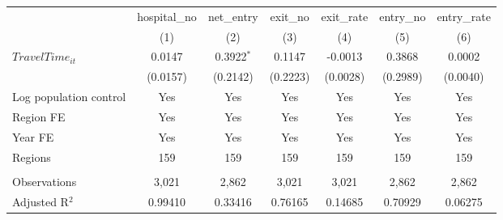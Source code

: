 \begingroup
\centering
\begin{tabular}{lcccccc}
   \toprule
                          & hospital\_no  & net\_entry   & exit\_no  & exit\_rate  & entry\_no  & entry\_rate \\    
                          & (1)           & (2)          & (3)       & (4)         & (5)        & (6)\\  
   \midrule 
   $TravelTime_{it}$      & 0.0147        & 0.3922$^{*}$ & 0.1147    & -0.0013     & 0.3868     & 0.0002\\   
                          & (0.0157)      & (0.2142)     & (0.2223)  & (0.0028)    & (0.2989)   & (0.0040)\\   
   Log population control & Yes           & Yes          & Yes       & Yes         & Yes        & Yes\\  
   Region FE              & Yes           & Yes          & Yes       & Yes         & Yes        & Yes\\  
   Year FE                & Yes           & Yes          & Yes       & Yes         & Yes        & Yes\\  
   Regions                & 159           & 159          & 159       & 159         & 159        & 159\\  
    \\
   Observations           & 3,021         & 2,862        & 3,021     & 3,021       & 2,862      & 2,862\\  
   Adjusted R$^2$         & 0.99410       & 0.33416      & 0.76165   & 0.14685     & 0.70929    & 0.06275\\  
   \bottomrule
\end{tabular}
\par\endgroup
